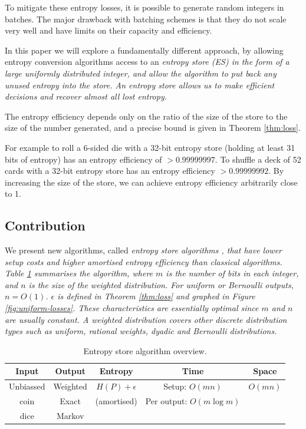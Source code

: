 \documentclass[12pt]{article}
\begin{document}
To mitigate these entropy losses, it is possible to generate random integers in batches. The major drawback with batching schemes is that they do not scale very well and have limits on their capacity and efficiency.

In this paper we will explore a fundamentally different approach, by allowing entropy conversion algorithms access to an \em entropy store \em (ES) in the form of a large uniformly distributed integer, and allow the algorithm to put back any unused entropy into the store. An entropy store allows us to make efficient decisions and recover almost all lost entropy.

The entropy efficiency depends only on the ratio of the size of the store to the size of the number generated, and a precise bound is given in Theorem \ref{thm:loss}. 

For example to roll a 6-sided die with a 32-bit entropy store (holding at least 31 bits of entropy) has an entropy efficiency of $>0.99999997$. To shuffle a deck of 52 cards with a 32-bit entropy store has an entropy efficiency $>0.99999992$. By increasing the size of the store, we can achieve entropy efficiency arbitrarily close to 1.


\subsection {Contribution}

We present new algorithms, called \em entropy store algorithms \em, that have lower setup costs and higher amortised entropy efficiency than classical algorithms. Table \ref{tab:entropy-store} summarises the algorithm, where $m$ is the number of bits in each integer, and $n$ is the size of the weighted distribution. For uniform or Bernoulli outputs, $n=O(1)$. $\epsilon$ is defined in Theorem \ref{thm:loss} and graphed in Figure \ref{fig:uniform-losses}. These characteristics are essentially optimal since $m$ and $n$ are usually constant.  A weighted distribution covers other discrete distribution types such as uniform, rational weights, dyadic and Bernoulli distributions.

\begin{table}[h!]
\centering
\begin{tabular}{|c|c|c|c|c|}
\hline
Input & Output & Entropy & Time & Space \\
\hline
Unbiassed & Weighted & $H(P)+\epsilon$ & Setup: $O(mn)$ & $O(mn)$ \\
coin & Exact & (amortised) & Per output: $O(m \log m)$  &  \\
dice & Markov &  &   & \\
\hline
\end{tabular}
\caption{Entropy store algorithm overview.}
    \label{tab:entropy-store}
\end{table}
\end{document}
